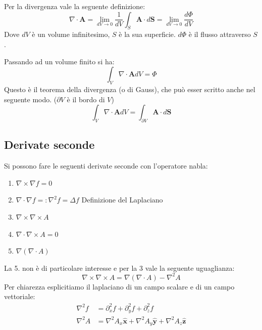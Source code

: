 \documentclass{article}
\newcommand{\mbf}{\mathbf}
\newcommand{\vers}[1]{\mbf{\hat #1 }}
\numberwithin{equation}{section}
\begin{document}
Per la divergenza vale la seguente definizione:
\begin{equation}    \label{eq:div_def} 
    \nabla \cdot \mbf A 
        = \lim_{ dV \to 0 } \frac{ 1 }{ dV } \int_S \mbf A \cdot d \mbf S 
        = \lim_{ dV \to 0 } \frac{ d\Phi }{ dV }
\end{equation}
Dove $dV$ è un volume infinitesimo, $S$ è la sua superficie. $d\Phi$ è il flusso attraverso $S$.

Passando ad un volume finito si ha:
\begin{equation*}
    \int_V \nabla \cdot \mbf A dV = \Phi
\end{equation*}
Questo è il teorema della divergenza (o di Gauss), che può esser scritto anche nel seguente modo. ($\partial V$ è il bordo di $V$)
\begin{equation}
    \int_V \nabla \cdot \mbf A dV = \int_{\partial V} \mbf A \cdot d \mbf S
\end{equation}



\subsection{Derivate seconde} %
\label{sub:derivate_seconde}

Si possono fare le seguenti derivate seconde con l'operatore nabla:
\begin{enumerate}
    \item $\nabla \times \nabla f = 0 $ 
    \item $\nabla \cdot \nabla f =: \nabla^2 f = \Delta f$ Definizione del Laplaciano
    \item $\nabla \times \nabla \times A$ 
    \item $\nabla \cdot \nabla \times A = 0$ 
    \item $\nabla (\nabla \cdot A)$ 
\end{enumerate}
La 5. non è di particolare interesse e per la 3 vale la seguente uguaglianza:
\begin{equation}
    \nabla \times \nabla \times A = \nabla (\nabla \cdot A) - \nabla^2 A
\end{equation}
Per chiarezza esplicitiamo il laplaciano di un campo scalare e di un campo vettoriale:
\begin{align}
    \nabla^2 f &= \partial_x^2 f + \partial_y^2 f + \partial_z^2 f \\
    \nabla^2 A &= \nabla^2 A_x \vers x + \nabla^2 A_y \vers y + \nabla^2 A_z \vers z
\end{align}
\end{document}
